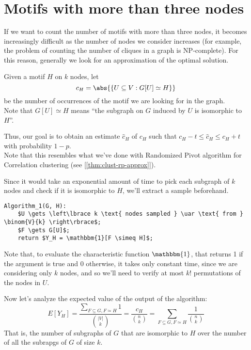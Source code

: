 \section{Motifs with more than three nodes}\label{sec:big-motifs}

If we want to count the number of motifs with more than three nodes, it becomes increasingly difficult as the number of nodes we consider increases (for example, the problem of counting the number of cliques in a graph is NP-complete). For this reason, generally we look for an approximation of the optimal solution.

\begin{defn}
    Given a motif $H$ on $k$ nodes, let
    \begin{equation}\label{eq:motif}
        c_H = \abs{\{U \subseteq V : G[U] \simeq H\}}
    \end{equation}
    be the number of occurrences of the motif we are looking for in the graph.\\
    Note that $G[U] \simeq H$ means ``the subgraph on $G$ induced by $U$ is isomorphic to $H$''. 
\end{defn}

Thus, our goal is to obtain an estimate $\hat{c}_H$ of $c_H$ such that $c_H - t \leq \hat{c}_H \leq c_H + t$ with probability $1-p$.\\
Note that this resembles what we've done with Randomized Pivot algorithm for Correlation clustering (see [\ref{thm:clust-rp-approx}]).

Since it would take an exponential amount of time to pick each subgraph of $k$ nodes and check if it is isomorphic to $H$, we'll extract a sample beforehand.

\begin{lstlisting}[caption={Algorithm 1}, label={lst:motifs-alg1}]
Algorithm_1(G, H):
    $U \gets \left\lbrace k \text{ nodes sampled } \uar \text{ from } \binom{V}{k} \right\rbrace$;
    $F \gets G[U]$;
    return $Y_H = \mathbbm{1}[F \simeq H]$;
\end{lstlisting}
Note that, to evaluate the characteristic function $\mathbbm{1}$, that returns 1 if the argument is true and 0 otherwise, it takes only constant time, since we are considering only $k$ nodes, and so we'll need to verify at most $k!$ permutations of the nodes in $U$.

Now let's analyze the expected value of the output of the algorithm:
\begin{equation}\label{eq:eyh-1}
    E[Y_H] = \frac{\sum_{F \subseteq G, F \simeq H} 1}{\binom{|V|}{k}} = \frac{c_H}{\binom{n}{k}} = \sum_{F \subseteq G, F \simeq H} \frac{1}{\binom{n}{k}}
\end{equation}
That is, the number of subgraphs of $G$ that are isomorphic to $H$ over the number of all the subrapgs of $G$ of size $k$.

